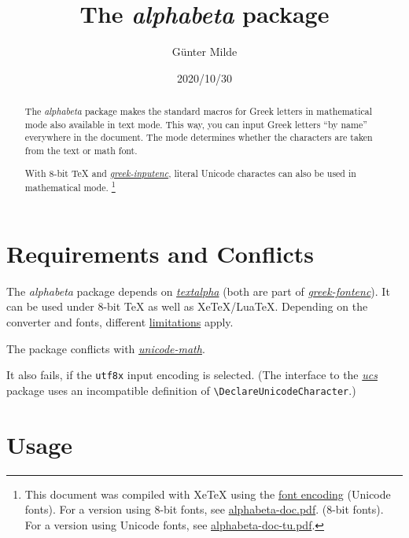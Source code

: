 \documentclass[a4paper]{scrartcl}
\newcommand{\engine}{XeTeX}
\newcommand{\engine}{LuaTeX}
\newcommand{\engine}{pdfTeX}
\newcommand{\cs}[1]{\texttt{\textbackslash#1}}
\newcommand{\pkgref}[1]{\emph{\href{https://ctan.org/pkg/#1}{#1}}}
\begin{document}
\title{The \emph{alphabeta} package}
\author{Günter Milde}
\date{2020/10/30}
\maketitle

\begin{abstract}\noindent
The \emph{alphabeta} package makes the standard macros for Greek letters in
mathe­matical mode also available in text mode. This way, you can input Greek
letters ``by name'' everywhere in the document. The mode determines whether
the characters are taken from the text or math font.

With 8-bit TeX and \pkgref{greek-inputenc},
literal Unicode charactes can also be used in mathematical mode.%
\footnote{\label{compiler}%
  This document was compiled with \engine{} using the
  \href{https://ctan.org/pkg/encguide}{font encoding} \encodingdefault{}
  \ifdefined \UTFencname %
     (Unicode fonts).
     For a version using 8-bit fonts, see
     \href{alphabeta-doc.pdf}{alphabeta-doc.pdf}.
  \else
     (8-bit fonts).
     For a version using Unicode fonts, see
     \href{alphabeta-doc-tu.pdf}{alphabeta-doc-tu.pdf}.
  \fi
}
\end{abstract}

\tableofcontents


\section{Requirements and Conflicts}

The \emph{alphabeta} package depends on
\emph{\href{textalpha-doc.pdf}{textalpha}}
(both are part of \pkgref{greek-fontenc}).
It can be used under 8-bit TeX as well as XeTeX/LuaTeX.
Depending on the converter and fonts, different
\hyperref[sec:limitations]{limitations} apply.

The package conflicts with \pkgref{unicode-math}.

It also fails, if the \texttt{utf8x} input encoding is selected.
(The interface to the \pkgref{ucs} package uses an incompatible
definition of \cs{DeclareUnicodeCharacter}.)


\section{Usage}
\end{document}

